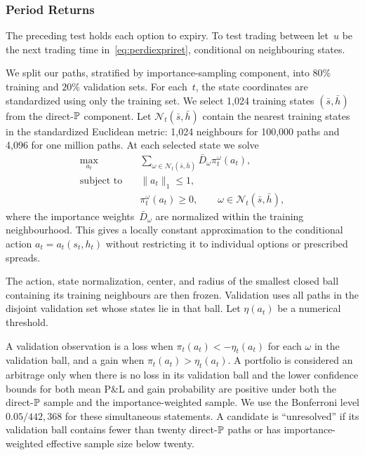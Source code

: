 \subsubsection{Period Returns}

The preceding test holds each option to expiry. To test trading between
let~$u$ be the next trading time in~\eqref{eq:perdiexpriret}, conditional
on neighbouring states.


We split our paths, stratified by importance-sampling component, into
$80\%$ training and $20\%$ validation sets. For each~$t$, the state
coordinates are standardized using only the training set. We select 1,024
training states $(\bar s,\bar h)$ from the direct-$\P$ component. Let
$\mathcal N_t(\bar s,\bar h)$ contain the nearest training states in the
standardized Euclidean metric: 1,024 neighbours for 100,000 paths and 4,096
for one million paths. At each selected state we solve
\begin{equation}\label{eq:period_local_lp}
\begin{split}
 \max_{a_t}\quad
 &\sum_{\omega\in\mathcal N_t(\bar s,\bar h)}
   \bar D_\omega\pi_t^\omega(a_t),\\
 \text{subject to}\quad
 &\|a_t\|_1\leq1,\\
 &\pi_t^\omega(a_t)\geq0,
 \qquad \omega\in\mathcal N_t(\bar s,\bar h),
\end{split}
\end{equation}
where the importance weights~$\bar D_\omega$ are normalized within the
training neighbourhood. This gives a locally constant approximation to the
conditional action $a_t=a_t(s_t,h_t)$ without restricting it to individual
options or prescribed spreads.

The action, state normalization, center, and radius of the smallest closed
ball containing its training neighbours are then frozen. Validation uses all
paths in the disjoint validation set whose states lie in that ball. Let $\eta(a_t)$
be a numerical threshold.

A validation observation is a loss when
$\pi_t(a_t)<-\eta_t(a_t)$ for each $\omega$ in the validation ball, and a gain when
$\pi_t(a_t)>\eta_t(a_t)$. A portfolio is considered an arbitrage only when there is
no loss in its validation ball and the lower confidence bounds for both mean
P\&L and gain probability are positive under both the direct-$\P$ sample and
the importance-weighted sample. We use the Bonferroni level
$0.05/442{,}368$ for these simultaneous statements. A candidate is ``unresolved''
if its validation ball contains fewer than twenty direct-$\P$ paths or has
importance-weighted effective sample size below twenty. 

